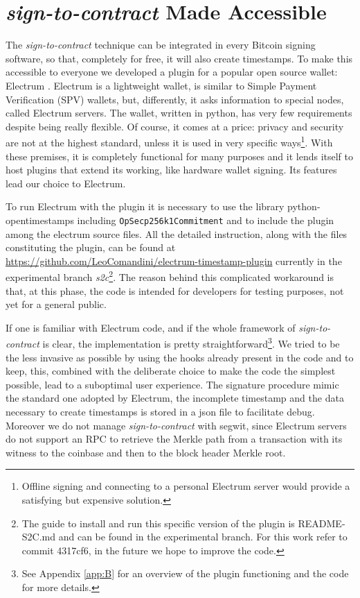 \section{\textit{sign-to-contract} Made Accessible}
The \textit{sign-to-contract} technique can be integrated in every Bitcoin signing software, so that, completely for free, it will also create timestamps.
To make this accessible to everyone we developed a plugin for a popular open source wallet: Electrum \cite{ElectrumWeb, ElectrumGithub}. 
Electrum is a lightweight wallet, is similar to Simple Payment Verification (SPV) wallets, but, differently, it asks information to special nodes, called Electrum servers. The wallet, written in python, has very few requirements despite being really flexible. Of course, it comes at a price: privacy and security are not at the highest standard, unless it is used in very specific ways\footnote{Offline signing and connecting to a personal Electrum server would provide a satisfying but expensive solution.}.
With these premises, it is completely functional for many purposes and it lends itself to host plugins that extend its working, like hardware wallet signing. 
Its features lead our choice to Electrum.

To run Electrum with the plugin it is necessary to use the library python-opentimestamps including \verb|OpSecp256k1Commitment| and to include the plugin among the electrum source files. All the detailed instruction, along with the files constituting the plugin, can be found at \url{https://github.com/LeoComandini/electrum-timestamp-plugin} currently in the experimental branch \textit{s2c}\footnote{The guide to install and run this specific version of the plugin is README-S2C.md and can be found in the experimental branch. For this work refer to commit 4317cf6, in the future we hope to improve the code.}. The reason behind this complicated workaround is that, at this phase, the code is intended for developers for testing purposes, not yet for a general public.

If one is familiar with Electrum code, and if the whole framework of \textit{sign-to-contract} is clear, the implementation is pretty straightforward\footnote{See Appendix \ref{app:B} for an overview of the plugin functioning and the code for more details.}.  We tried to be the less invasive as possible by using the hooks already present in the code and to keep, this, combined with the deliberate choice to make the code the simplest possible, lead to a suboptimal user experience. 
The signature procedure mimic the standard one adopted by Electrum, the incomplete timestamp and the data necessary to create timestamps is stored in a json file to facilitate debug.
Moreover we do not manage \textit{sign-to-contract} with segwit, since Electrum servers do not support an RPC to retrieve the Merkle path from a transaction with its witness to the coinbase and then to the block header Merkle root.

